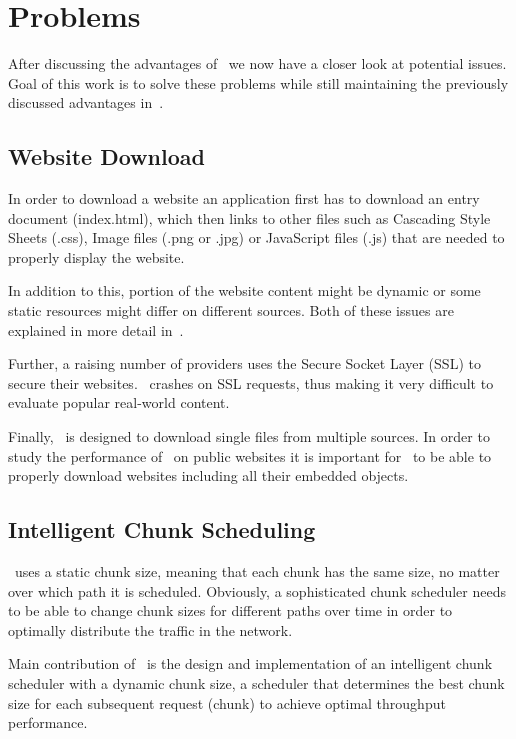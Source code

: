 \section{Problems}
\label{sec:vanilla-problems}

After discussing the advantages of \protoold~we now have a closer look at potential issues. 
Goal of this work is to solve these problems while still maintaining the previously discussed advantages in~. 

\subsection{Website Download}
\label{sec:problem-website}

In order to download a website an application first has to download an entry document (\eg index.html), which then links to other files such as Cascading Style Sheets (.css), Image files (\eg .png or .jpg) or JavaScript files (.js) that are needed to properly display the website. 

In addition to this, portion of the website content might be dynamic or some static resources might differ on different sources. 
Both of these issues are explained in more detail in~.

Further, a raising number of providers uses the Secure Socket Layer (SSL) to secure their websites. 
\protoold~crashes on SSL requests, thus making it very difficult to evaluate popular real-world content. 

Finally, \protoold~is designed to download single files from multiple sources. 
In order to study the performance of \mhttp~on public websites it is important for \protonew~to be able to properly download websites including all their embedded objects. 

\subsection{Intelligent Chunk Scheduling}
\label{sec:problem-static-size}

\protoold~uses a static chunk size, meaning that each chunk has the same size, no matter over which path it is scheduled. 
Obviously, a sophisticated chunk scheduler needs to be able to change chunk sizes for different paths over time in order to optimally distribute the traffic in the network. 

Main contribution of \protonew~is the design and implementation of an intelligent chunk scheduler with a dynamic chunk size, \ie a scheduler that determines the best chunk size for each subsequent request (chunk) to achieve optimal throughput performance. 
